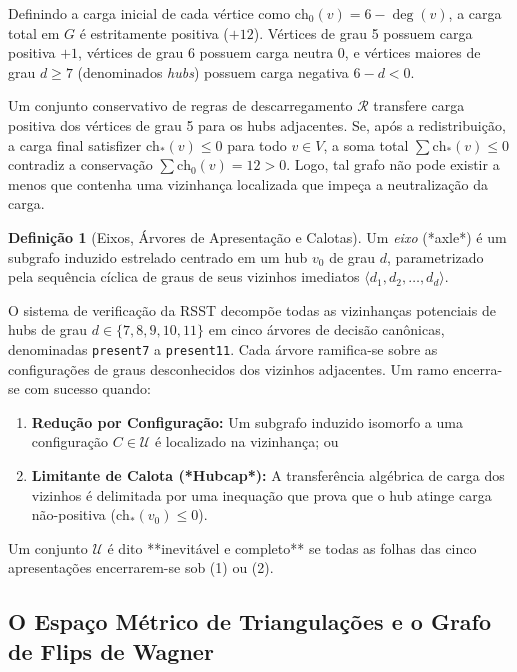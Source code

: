 \documentclass[11pt,a4paper]{article}
\theoremstyle{plain}
\theoremstyle{definition}
\newtheorem{definition}[theorem]{Definição}
\begin{document}
Definindo a carga inicial de cada vértice como $\text{ch}_0(v) = 6 - \deg(v)$, a carga total em $G$ é estritamente positiva ($+12$). Vértices de grau 5 possuem carga positiva $+1$, vértices de grau 6 possuem carga neutra $0$, e vértices maiores de grau $d \ge 7$ (denominados \emph{hubs}) possuem carga negativa $6 - d < 0$.

Um conjunto conservativo de regras de descarregamento $\mathcal{R}$ transfere carga positiva dos vértices de grau 5 para os hubs adjacentes. Se, após a redistribuição, a carga final satisfizer $\text{ch}_*(v) \le 0$ para todo $v \in V$, a soma total $\sum \text{ch}_*(v) \le 0$ contradiz a conservação $\sum \text{ch}_0(v) = 12 > 0$. Logo, tal grafo não pode existir a menos que contenha uma vizinhança localizada que impeça a neutralização da carga.

\begin{definition}[Eixos, Árvores de Apresentação e Calotas]
Um \emph{eixo} (*axle*) é um subgrafo induzido estrelado centrado em um hub $v_0$ de grau $d$, parametrizado pela sequência cíclica de graus de seus vizinhos imediatos $\langle d_1, d_2, \dots, d_d \rangle$.

O sistema de verificação da RSST decompõe todas as vizinhanças potenciais de hubs de grau $d \in \{7, 8, 9, 10, 11\}$ em cinco árvores de decisão canônicas, denominadas \texttt{present7} a \texttt{present11}. Cada árvore ramifica-se sobre as configurações de graus desconhecidos dos vizinhos adjacentes. Um ramo encerra-se com sucesso quando:
\begin{enumerate}
    \item \textbf{Redução por Configuração:} Um subgrafo induzido isomorfo a uma configuração $C \in \mathcal{U}$ é localizado na vizinhança; ou
    \item \textbf{Limitante de Calota (*Hubcap*):} A transferência algébrica de carga dos vizinhos é delimitada por uma inequação que prova que o hub atinge carga não-positiva ($\text{ch}_*(v_0) \le 0$).
\end{enumerate}
Um conjunto $\mathcal{U}$ é dito **inevitável e completo** se todas as folhas das cinco apresentações encerrarem-se sob (1) ou (2).
\end{definition}

\subsection{O Espaço Métrico de Triangulações e o Grafo de Flips de Wagner}
\end{document}
